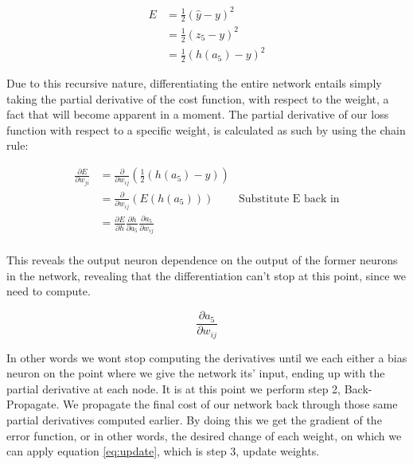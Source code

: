 \begin{align}
    E &= \frac{1}{2}(\hat{y} - y)^2 \\
      &= \frac{1}{2}(z_5 - y)^2     \\
      &= \frac{1}{2}(h(a_5) - y)^2
\end{align}

Due to this recursive nature, differentiating the entire network entails simply
taking the partial derivative of the cost function, with respect to the weight,
a fact that will become apparent in a moment. The partial derivative of our loss
function with respect to a specific weight, is calculated as such by using the
chain rule:

\begin{align}
    \frac{\partial E}{\partial w_{ji}}
        &= \frac{\partial}{\partial w_{ij}} \left(\frac{1}{2}(h(a_5) - y) \right)\\
        &= \frac{\partial}{\partial w_{ij}}\left(E(h(a_5))\right) & \text{Substitute E back in}\\
        &= \frac{\partial E}{\partial h}\frac{\partial h}{\partial a_5}\frac{\partial a_5}{\partial w_{ij}}\\
\end{align}

This reveals the output neuron dependence on the output of the former neurons in
the network, revealing that the differentiation can't stop at this point, since
we need to compute.

$$\frac{\partial a_5}{\partial w_{ij}}$$

In other words we wont stop computing the derivatives until we each either a
bias neuron on the point where we give the network its' input, ending up with
the partial derivative at each node. It is at this point we perform step 2,
Back-Propagate. We propagate the final cost of our network back through those
same partial derivatives computed earlier. By doing this we get the gradient of
the error function, or in other words, the desired change of each weight, on
which we can apply equation \eqref{eq:update}, which is step 3, update weights.


